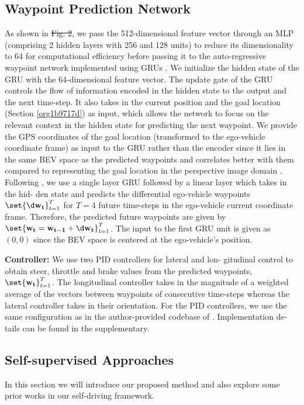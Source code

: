 \documentclass[letterpaper, 12pt]{article}
\theoremstyle{definition}
\theoremstyle{definition}
\theoremstyle{definition}
\theoremstyle{definition}
\theoremstyle{definition}
\begin{document}
\subsection{Waypoint Prediction Network \label{org89c5fc9}}
\label{sec:org329a454}
As shown in \sout{Fig. 2}, we pass the 512-dimensional feature vector through an MLP
(comprising 2 hidden layers with 256 and 128 units) to reduce its dimensionality
to 64 for computational efficiency before passing it to the auto-regressive
waypoint network implemented using GRUs \cite{Cho2014}. We initialize the hidden
state of the GRU with the 64-dimensional feature vector. The update gate of the
GRU controls the flow of information encoded in the hidden state to the output
and the next time-step. It also takes in the current position and the goal
location (Section \ref{org1b9717d}) as input, which allows the network to focus
on the relevant context in the hidden state for predicting the next waypoint.
We provide the GPS coordinates of the goal location (transformed to the
ego-vehicle coordinate frame) as input to the GRU rather than the encoder since
it lies in the same BEV space as the predicted waypoints and correlates better
with them compared to representing the goal location in the perspective image
domain \cite{Chen2019}. Following \cite{Filos2020}, we use a single layer GRU
followed by a linear layer which takes in the hid- den state and predicts the
differential ego-vehicle waypoints \(\set{\d \bf w_{t}}_{t=1}^{T}\) for \(T=4\)
future time-steps in the ego-vehicle current coordinate frame. Therefore, the
predicted future waypoints are given by \(\set{\bf w_{t}=\bf w_{t-1} +\d \bf
w_{t}}_{t=1}^{T}\). The input to the first GRU unit is given as \((0,0)\) since
the BEV space is centered at the ego-vehicle’s position.

\textbf{Controller:} We use two PID controllers for lateral and lon- gitudinal control
to obtain steer, throttle and brake values from the predicted waypoints,
\(\set{\bf w_{t}}_{t=1}^{T}\). The longitudinal controller takes in the
magnitude of a weighted average of the vectors between waypoints of consecutive
time-steps whereas the lateral controller takes in their orientation. For the
PID controllers, we use the same configuration as in the author-provided
codebase of \cite{Chen2019}. Implementation de- tails can be found in the supplementary.
\subsection{Self-supervised Approaches}
\label{sec:orga5fdd80}
In this section we will introduce our proposed method and also explore some
prior works in our self-driving framework.
\end{document}
